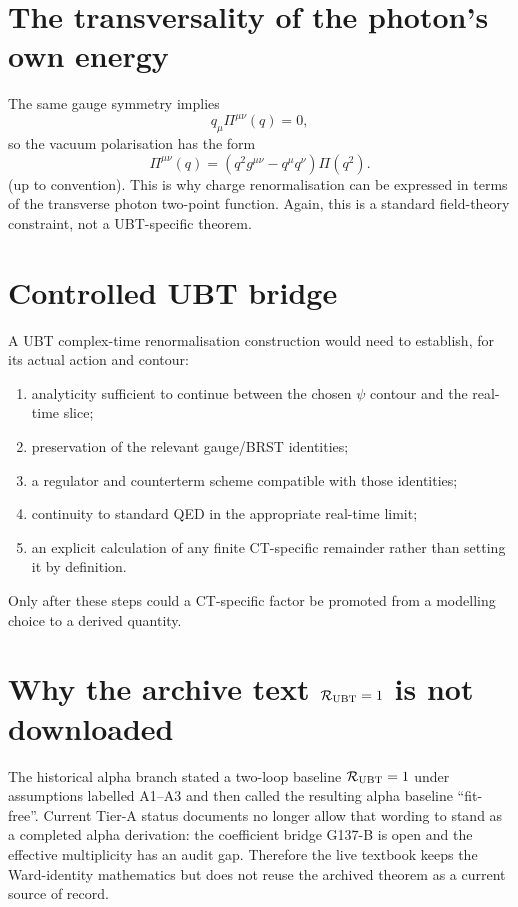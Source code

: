 \section{The transversality of the photon's own energy}
The same gauge symmetry implies
\[
 q_\mu\Pi^{\mu\nu}(q)=0,
\]
so the vacuum polarisation has the form
\[
 \Pi^{\mu\nu}(q)
 =\left(q^2g^{\mu\nu}-q^\mu q^\nu\right)\Pi(q^2).
\]
(up to convention).  This is why charge renormalisation can be expressed in
terms of the transverse photon two-point function.  Again, this is a standard
field-theory constraint, not a UBT-specific theorem.

\section{Controlled UBT bridge}
A UBT complex-time renormalisation construction would need to establish, for
its actual action and contour:
\begin{enumerate}
 \item analyticity sufficient to continue between the chosen $\psi$ contour
       and the real-time slice;
 \item preservation of the relevant gauge/BRST identities;
 \item a regulator and counterterm scheme compatible with those identities;
 \item continuity to standard QED in the appropriate real-time limit;
 \item an explicit calculation of any finite CT-specific remainder rather than
       setting it by definition.
\end{enumerate}
Only after these steps could a CT-specific factor be promoted from a modelling
choice to a derived quantity.

\section{Why the archive text \(\mathcal R_{\rm UBT}=1\) is not downloaded}
The historical alpha branch stated a two-loop baseline
\(\mathcal R_{\rm UBT}=1\) under assumptions labelled A1--A3 and then called the
resulting alpha baseline ``fit-free''.  Current Tier-A status documents no
longer allow that wording to stand as a completed alpha derivation: the
coefficient bridge G137-B is open and the effective multiplicity has an audit
gap.  Therefore the live textbook keeps the Ward-identity mathematics but does
not reuse the archived theorem as a current source of record.

